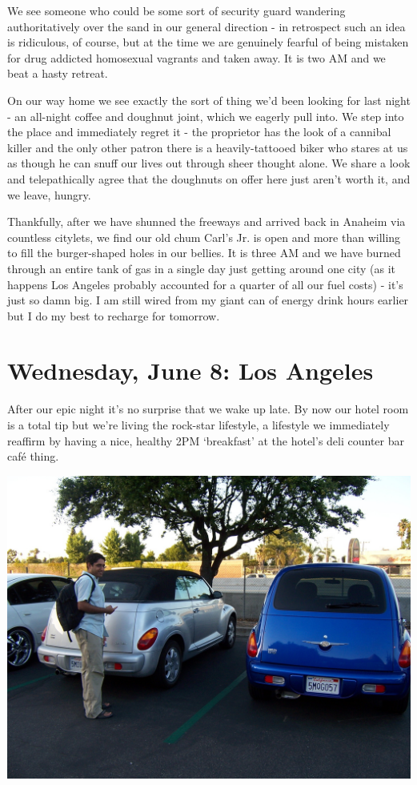 \documentclass[a5paper,titlepage,11pt]{book}
\begin{document}
We see someone who could be some sort of security guard wandering authoritatively over the sand in our general direction - in retrospect such an idea is ridiculous, of course, but at the time we are genuinely fearful of being mistaken for drug addicted homosexual vagrants and taken away.  It is two AM and we beat a hasty retreat.

On our way home we see exactly the sort of thing we'd been looking for last night - an all-night coffee and doughnut joint, which we eagerly pull into.  We step into the place and immediately regret it - the proprietor has the look of a cannibal killer and the only other patron there is a heavily-tattooed biker who stares at us as though he can snuff our lives out through sheer thought alone.  We share a look and telepathically agree that the doughnuts on offer here just aren't worth it, and we leave, hungry.

Thankfully, after we have shunned the freeways and arrived back in Anaheim via countless citylets, we find our old chum Carl's Jr. is open and more than willing to fill the burger-shaped holes in our bellies.  It is three AM and we have burned through an entire tank of gas in a single day just getting around one city (as it happens Los Angeles probably accounted for a quarter of all our fuel costs) - it's just so damn big.  I am still wired from my giant can of energy drink hours earlier but I do my best to recharge for tomorrow.

\chapter[Los Angeles]{Wednesday, June 8: Los Angeles}
After our epic night it's no surprise that we wake up late.  By now our hotel room is a total tip but we're living the rock-star lifestyle, a lifestyle we immediately reaffirm by having a nice, healthy 2PM `breakfast' at the hotel's deli counter bar caf\'{e} thing.

\begin{center}\includegraphics[width=\textwidth]{gfx/100_1793}\end{center}
\end{document}
